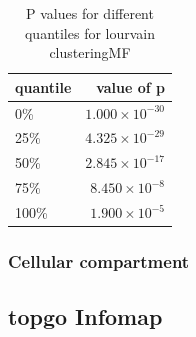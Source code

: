 \begin{table}[ht]
\centering

\begin{tabular}{lr}
  \hline
quantile & value of p \\ 
  \hline
0\% & $1.000 \times 10^{-30}$ \\ 
  25\% & $4.325 \times 10^{-29}$ \\ 
  50\% & $2.845 \times 10^{-17}$ \\ 
  75\% & $8.450 \times 10^{-8}$ \\ 
  100\% & $1.900 \times 10^{-5}$ \\ 
   \hline
\end{tabular}
\caption{P values for different quantiles for lourvain clusteringMF} 
\label{tabP values for different quantiles for lourvain clusteringMF}
\end{table}

\subsubsection{Cellular compartment}



\subsection{topgo Infomap}

